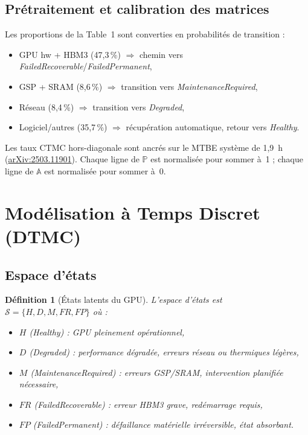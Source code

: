 \documentclass[12pt,a4paper]{article}
\newtheorem{definition}{Définition}
\begin{document}
\subsection{Prétraitement et calibration des matrices}

Les proportions de la Table~1 sont converties en probabilités de transition :
\begin{itemize}
  \item GPU hw + HBM3 (47,3\,\%) $\Rightarrow$ chemin vers \textit{FailedRecoverable}/\textit{FailedPermanent},
  \item GSP + SRAM (8,6\,\%) $\Rightarrow$ transition vers \textit{MaintenanceRequired},
  \item Réseau (8,4\,\%) $\Rightarrow$ transition vers \textit{Degraded},
  \item Logiciel/autres (35,7\,\%) $\Rightarrow$ récupération automatique, retour vers \textit{Healthy}.
\end{itemize}
Les taux CTMC hors-diagonale sont ancrés sur le MTBE système de 1,9~h
(\href{https://arxiv.org/pdf/2503.11901}{arXiv:2503.11901}).
Chaque ligne de $\mathbb{P}$ est normalisée pour sommer à~1 ; chaque ligne de $\mathbb{A}$
est normalisée pour sommer à~0.

\section{Modélisation à Temps Discret (DTMC)}

\subsection{Espace d'états}

\begin{definition}[États latents du GPU]
L'espace d'états est $\mathcal{S} = \{H, D, M, FR, FP\}$ où :
\begin{itemize}
  \item $H$ (\textit{Healthy}) : GPU pleinement opérationnel,
  \item $D$ (\textit{Degraded}) : performance dégradée, erreurs réseau ou thermiques légères,
  \item $M$ (\textit{MaintenanceRequired}) : erreurs GSP/SRAM, intervention planifiée nécessaire,
  \item $FR$ (\textit{FailedRecoverable}) : erreur HBM3 grave, redémarrage requis,
  \item $FP$ (\textit{FailedPermanent}) : défaillance matérielle irréversible, état absorbant.
\end{itemize}
\end{definition}
\end{document}
